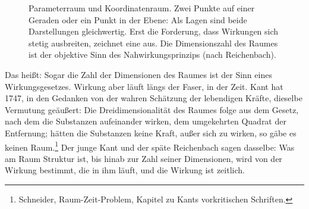 \begin{figure}[htbp]
\centering
{}
\caption{Parameterraum und Koordinatenraum. Zwei Punkte auf einer Geraden oder ein Punkt in der Ebene: Als Lagen sind beide Darstellungen gleichwertig. Erst die Forderung, dass Wirkungen sich stetig ausbreiten, zeichnet eine aus. Die Dimensionszahl des Raumes ist der objektive Sinn des Nahwirkungsprinzips (nach Reichenbach).}
\label{abb:parameterraum}
\end{figure}

Das heißt: Sogar die Zahl der Dimensionen des Raumes ist der Sinn eines Wirkungsgesetzes. Wirkung aber läuft längs der Faser, in der Zeit. Kant hat 1747, in den Gedanken von der wahren Schätzung der lebendigen Kräfte, dieselbe Vermutung geäußert: Die Dreidimensionalität des Raumes folge aus dem Gesetz, nach dem die Substanzen aufeinander wirken, dem umgekehrten Quadrat der Entfernung; hätten die Substanzen keine Kraft, außer sich zu wirken, so gäbe es keinen Raum.\footnote{Schneider, Raum-Zeit-Problem, Kapitel zu Kants vorkritischen Schriften.} Der junge Kant und der späte Reichenbach sagen dasselbe: Was am Raum Struktur ist, bis hinab zur Zahl seiner Dimensionen, wird von der Wirkung bestimmt, die in ihm läuft, und die Wirkung ist zeitlich.

